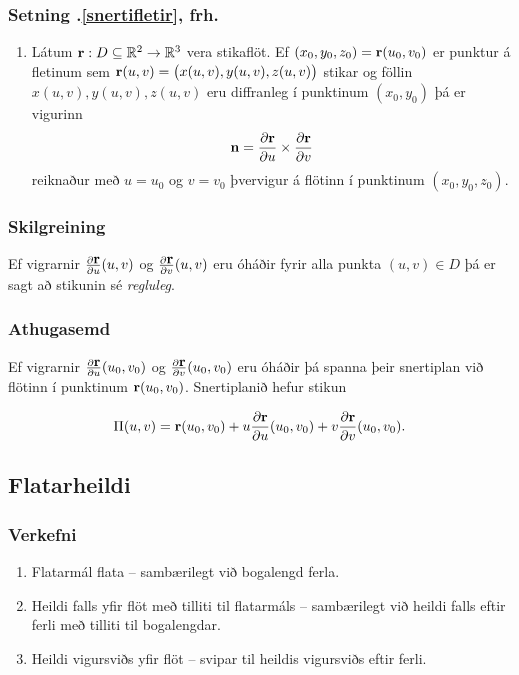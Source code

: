  \subsubsection{Setning \kaflanr.\ref{snertifletir}, frh.}
     \begin {enumerate}
    \item [3.] 
  Látum $\mbox{${\bf r}$}: D\subseteq {\mathbb R}^2\rightarrow {\mathbb R}^3$ vera stikaflöt.  
Ef $(x_0, y_0, z_0)=\mbox{${\bf r}$}(u_0, v_0)$ er punktur á fletinum sem 
$\mbox{${\bf r}$}(u,v)=\big(x(u,v), y(u,v), z(u,v)\big)$ stikar og
föllin $x(u,v), y(u,v), z(u,v)$ eru diffranleg í punktinum $(x_0,
y_0)$ þá er vigurinn
     $$\mbox{${\bf n}$} =\frac{\partial \mbox{${\bf r}$}}{\partial u}\times 
\frac{\partial \mbox{${\bf r}$}}{\partial v}$$
reiknaður með $u=u_0$ og $v=v_0$ þvervigur á flötinn í punktinum 
$(x_0, y_0, z_0)$.
\end {enumerate}
 


\subsubsection{Skilgreining  \rtask{}}
Ef vigrarnir $\frac{\partial \mbox{${\bf r}$}}{\partial
  u}(u,v)$ og    $\frac{\partial \mbox{${\bf r}$}}{\partial v}(u,v)$ eru óháðir
fyrir alla punkta $(u,v)\in D$ þá er sagt að stikunin sé {\em
  regluleg}. 

 

\subsubsection{Athugasemd \rtask{}}
Ef vigrarnir  
$\frac{\partial \mbox{${\bf r}$}}{\partial u}(u_0,v_0)$ og    $\frac{\partial
  \mbox{${\bf r}$}}{\partial v}(u_0,v_0)$ eru óháðir þá spanna þeir snertiplan við
flötinn í punktinum $\mbox{${\bf r}$}(u_0,v_0)$. Snertiplanið hefur stikun 

$$\Pi(u,v) = \mbox{${\bf r}$}(u_0,v_0)+u\frac{\partial \mbox{${\bf r}$}}{\partial u}(u_0,v_0)
+v\frac{\partial \mbox{${\bf r}$}}{\partial v}(u_0,v_0).$$






\subsection{Flatarheildi} 

\subsubsection{Verkefni  \rtask{}}
\begin {enumerate}
 \item Flatarmál flata -- sambærilegt við bogalengd ferla.  
\item Heildi falls yfir flöt með tilliti til flatarmáls -- sambærilegt við heildi falls eftir ferli með tilliti til bogalengdar.
\item Heildi vigursviðs yfir flöt -- svipar til heildis vigursviðs eftir ferli. 
 \end {enumerate}









